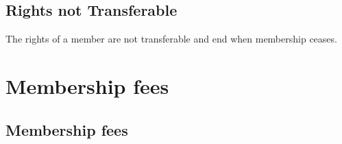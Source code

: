 \documentclass[../constitution.tex]{subfiles}
\begin{document}
\subsection{Rights not Transferable} \label{rights-not-transferable}

The rights of a member are not transferable and end when membership ceases.


\section{Membership fees} \label{division-2-membership-fees}

\subsection{Membership fees} \label{membership-fees}

\end{document}
